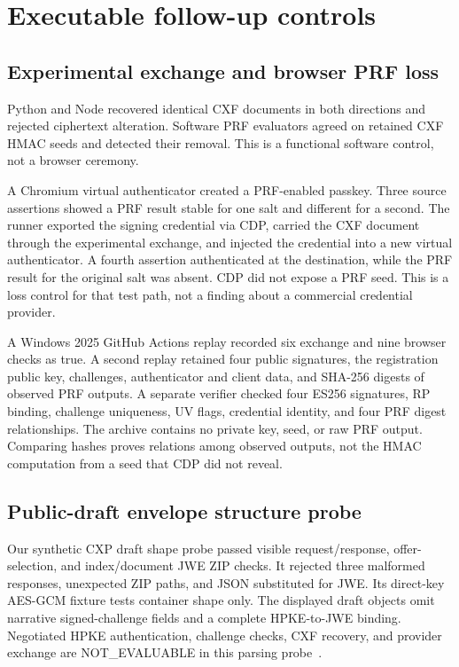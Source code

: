 \documentclass[letterpaper,twocolumn,10pt]{article}
\begin{document}
\section{Executable follow-up controls}
\subsection{Experimental exchange and browser PRF loss}
Python and Node recovered identical CXF documents in both directions and
rejected ciphertext alteration. Software PRF evaluators agreed on retained
CXF HMAC seeds and detected their removal. This is a functional software
control, not a browser ceremony.

A Chromium virtual authenticator created a PRF-enabled passkey. Three
source assertions showed a PRF result stable for one salt and different
for a second. The runner exported the signing credential via CDP, carried
the CXF document through the experimental exchange, and injected the
credential into a new virtual authenticator. A fourth assertion
authenticated at the destination, while the PRF result for the original
salt was absent. CDP did not expose a PRF seed. This is a loss control for
that test path, not a finding about a commercial credential provider.

A Windows 2025 GitHub Actions replay recorded six exchange and nine
browser checks as true. A second replay retained four public signatures,
the registration public key, challenges, authenticator and client data,
and SHA-256 digests of observed PRF outputs. A separate verifier
checked four ES256 signatures, RP binding, challenge uniqueness, UV
flags, credential identity, and four PRF digest relationships. The archive
contains no private key, seed, or raw PRF output. Comparing hashes proves
relations among observed outputs, not the HMAC computation from a seed
that CDP did not reveal.

\subsection{Public-draft envelope structure probe}
Our synthetic CXP draft shape probe passed visible request/response,
offer-selection, and index/document JWE ZIP checks. It rejected three
malformed responses, unexpected ZIP paths, and JSON substituted for JWE.
Its direct-key AES-GCM fixture tests container shape only. The displayed
draft objects omit narrative signed-challenge fields and a complete
HPKE-to-JWE binding. Negotiated HPKE authentication, challenge checks,
CXF recovery, and provider exchange are NOT\_EVALUABLE in this parsing
probe~\cite{cxp}.
\end{document}
